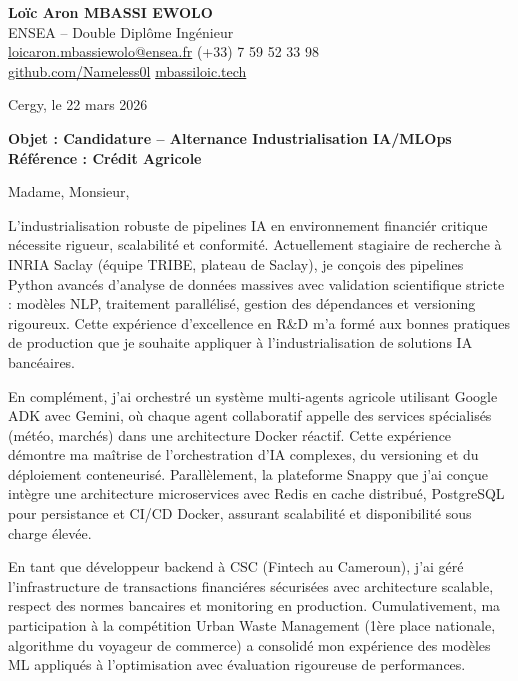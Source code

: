 \documentclass[a4paper,11pt]{article}
\begin{document}
\noindent
\textbf{Lo\"ic Aron MBASSI EWOLO} \\
ENSEA -- Double Dipl\^ome Ing\'enieur \\
\href{mailto:loicaron.mbassiewolo@ensea.fr}{loicaron.mbassiewolo@ensea.fr} \quad (+33) 7 59 52 33 98 \\
\href{https://github.com/Nameless0l}{github.com/Nameless0l} \quad \href{https://mbassiloic.tech}{mbassiloic.tech}

\vspace{1em}
\noindent Cergy, le 22 mars 2026

\vspace{1em}
\noindent
\textbf{Objet : Candidature -- Alternance Industrialisation IA/MLOps} \\
\textbf{R\'ef\'erence : Cr\'edit Agricole}

\vspace{1.5em}
\noindent Madame, Monsieur,

L'industrialisation robuste de pipelines IA en environnement financi\'er critique n\'ecessite rigueur, scalabilit\'e et conformit\'e. Actuellement stagiaire de recherche \`a INRIA Saclay (\'equipe TRIBE, plateau de Saclay), je con\c{c}ois des pipelines Python avanc\'es d'analyse de donn\'ees massives avec validation scientifique stricte : mod\`eles NLP, traitement parall\'elis\'e, gestion des d\'ependances et versioning rigoureux. Cette exp\'erience d'excellence en R\&D m'a form\'e aux bonnes pratiques de production que je souhaite appliquer \`a l'industrialisation de solutions IA banc\'eaires.

\vspace{0.8em}

En compl\'ement, j'ai orchestr\'e un syst\`eme multi-agents agricole utilisant Google ADK avec Gemini, o\`u chaque agent collaboratif appelle des services sp\'ecialis\'es (m\'et\'eo, march\'es) dans une architecture Docker r\'eactif. Cette exp\'erience d\'emontre ma ma\^itrise de l'orchestration d'IA complexes, du versioning et du d\'eploiement conteneuris\'e. Parallèlement, la plateforme Snappy que j'ai con\c{c}ue int\`egre une architecture microservices avec Redis en cache distribu\'e, PostgreSQL pour persistance et CI/CD Docker, assurant scalabilit\'e et disponibilit\'e sous charge \'elev\'ee.

\vspace{0.8em}

En tant que d\'eveloppeur backend \`a CSC (Fintech au Cameroun), j'ai g\'er\'e l'infrastructure de transactions financi\'eres s\'ecuris\'ees avec architecture scalable, respect des normes bancaires et monitoring en production. Cumulativement, ma participation \`a la comp\'etition Urban Waste Management (1\`ere place nationale, algorithme du voyageur de commerce) a consolid\'e mon exp\'erience des mod\`eles ML appliqu\'es \`a l'optimisation avec \'evaluation rigoureuse de performances.
\end{document}
